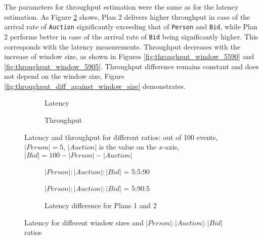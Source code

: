 The parameters for throughput estimation were the same as for the latency estimation. As Figure \ref{fig:throughput_ratio} shows, Plan 2 delivers higher throughput in case of the arrival rate of \texttt{Auction} significantly exceeding that of \texttt{Person} and \texttt{Bid}, while Plan 2 performs better in case of the arrival rate of \texttt{Bid} being significantly higher. This corresponds with the latency measurements. Throughput decreases with the increase of window size, as shown in Figures \ref{fig:throughput_window_5590} and \ref{fig:throughput_window_5905}. Throughput difference remains constant and does not depend on the window size, Figure \ref{fig:throughput_diff_against_window_size} demonstrates.

\begin{figure*}[t!]
    \begin{subfigure}[b]{0.43\textwidth}
            
            \captionsetup{justification=justified}
            \caption{Latency}
            \label{fig:latency_ratio}
    \end{subfigure}
    \hspace{5mm}
    \begin{subfigure}[b]{0.43\textwidth}
            
            \captionsetup{justification=justified}
            \caption{Throughput}
            \label{fig:throughput_ratio}
    \end{subfigure}
    \caption{Latency and throughput for different ratios: out of 100 events, $|Person| = 5$, $|Auction|$ is the value on the $x$-axis, $|Bid| = 100 - |Person| - |Auction|$}
    \label{fig:ratio_plots}
\end{figure*}

\begin{figure*}[t!]
    \begin{subfigure}[b]{0.32\textwidth}
            
            \captionsetup{justification=justified}
            \caption{$|Person|:|Auction|:|Bid|$ = 5:5:90}
            \label{fig:latency_window_5590}
    \end{subfigure}
    \hspace{2mm}
    \begin{subfigure}[b]{0.32\textwidth}
            
            \captionsetup{justification=justified}
            \caption{$|Person|:|Auction|:|Bid|$ = 5:90:5}
            \label{fig:latency_window_5905}
    \end{subfigure}
    \hspace{2mm}
    \begin{subfigure}[b]{0.32\textwidth}
            
            \captionsetup{justification=justified}
            \caption{Latency difference for Plans 1 and 2}
            \label{fig:latency_diff_against_window_size}
    \end{subfigure}
    \caption{Latency for different window sizes and $|Person|:|Auction|:|Bid|$ ratios}
    \label{fig:latency_plots}
\end{figure*}

